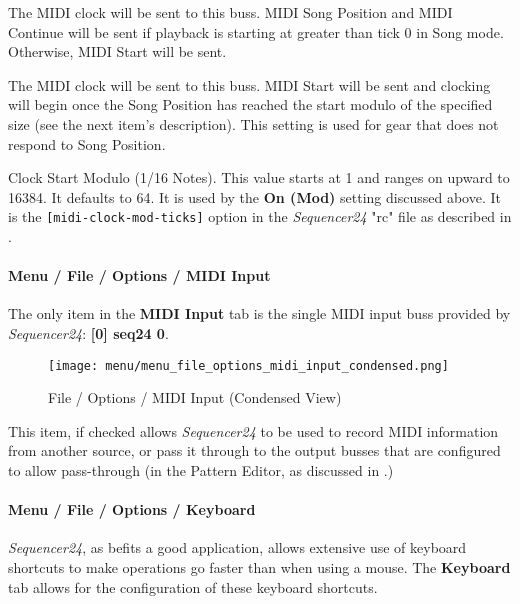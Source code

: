    The MIDI clock will be sent to this buss.
   MIDI Song Position and MIDI Continue will be sent if playback is starting
   at greater than tick 0 in Song mode.  Otherwise, MIDI Start will be sent.

   The MIDI clock will be sent to this buss.
   MIDI Start will be sent and clocking will begin
   once the Song Position has reached the start modulo of the specified size
   (see the next item's description).
   This setting is used for gear that does not respond to Song Position.

   Clock Start Modulo (1/16 Notes).
   This value starts at 1 and ranges on upward to 16384.
   It  defaults to 64.
   It is used by the \textbf{On (Mod)} setting discussed above.
   It is the \texttt{[midi-clock-mod-ticks]} option in the \textsl{Sequencer24}
   "rc" file as described in
   .


\paragraph{Menu / File / Options / MIDI Input}
\label{paragraph:seq24_menu_file_options_midi_input}

   The only item in the \textbf{MIDI Input} tab is the single MIDI input
   buss provided by \textsl{Sequencer24}:  \textbf{[0] seq24 0}.

\begin{figure}[H]
   \centering 
   \texttt{[image: menu/menu\_file\_options\_midi\_input\_condensed.png]}
   \caption{File / Options / MIDI Input (Condensed View)}
   \label{fig:seq24_menu_file_options_midi_input}
\end{figure}

   This item, if checked allows \textsl{Sequencer24} to be used to record MIDI
   information from another source, or pass it through to the output busses
   that are configured
   to allow pass-through
   (in the Pattern Editor, as discussed in 
   .)

\paragraph{Menu / File / Options / Keyboard }
\label{paragraph:seq24_menu_file_options_keyboard}

   \textsl{Sequencer24}, as befits a good application, allows extensive use of
   keyboard shortcuts to make operations go faster than when using a mouse.
   The \textbf{Keyboard} tab allows for the configuration of these keyboard
   shortcuts.

